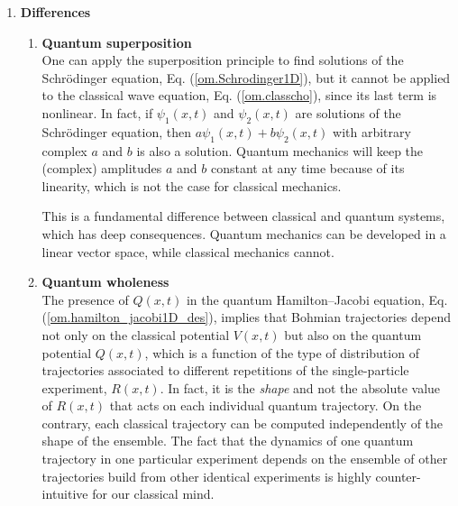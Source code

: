 \documentclass[nofootinbib, secnumarabic, amsmath, nobibnotes,11pt,aps,pra, floatfix]{revtex4-1}
\newcommand{\eref}[1]{Eq. (\ref{#1})}
\begin{document}
\begin{enumerate}
\item \textbf{Differences}
\begin{enumerate}
\item \textbf{Quantum superposition} \\ One can apply the superposition principle to find solutions of the Schr\"odinger equation, \eref{om.Schrodinger1D}, but it cannot be applied to the classical wave equation, \eref{om.classcho}, since its last term is nonlinear. In fact, if $\psi_1(x,t)$ and $\psi_2(x,t)$ are solutions of the Schr\"odinger equation, then $a\psi_1(x,t) + b\psi_2(x,t)$ with arbitrary complex $a$ and $b$ is also a solution. Quantum mechanics will keep the (complex) amplitudes $a$ and $b$ constant at any time because of its linearity, which is not the case for classical mechanics.

{\quad}This is a fundamental difference between classical and quantum systems, which has deep consequences. Quantum mechanics can be developed in a linear vector space, while classical mechanics cannot.

\item \textbf{Quantum wholeness} \\ The presence of $Q(x,t)$ in the quantum Hamilton--Jacobi equation, \eref{om.hamilton_jacobi1D_des}, implies that Bohmian trajectories depend not only on the classical potential $V(x,t)$ but also on the quantum potential $Q(x,t)$, which is a function of the type of distribution of trajectories associated to different repetitions of the single-particle experiment, $R(x,t)$. In fact, it is the \textit{shape} and not the absolute value of $R(x,t)$ that acts on each individual quantum trajectory. On the contrary, each classical trajectory can be computed independently of the shape of the ensemble. The fact that the dynamics of one quantum trajectory in one particular experiment depends on the ensemble of other trajectories build from other identical experiments is highly counter-intuitive for our classical mind. 


\end{enumerate}
\end{enumerate}
\end{document}
